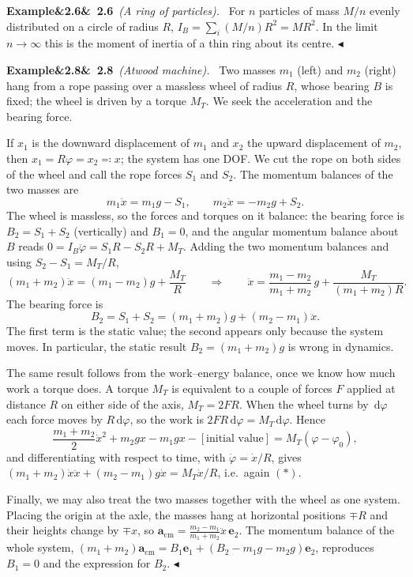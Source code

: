 \documentclass[11pt,a4paper,oneside]{report}
\numberwithin{equation}{chapter}
\newcommand{\vect}[1]{\bm{#1}}
\newcommand{\e}[1]{\vect{e}_{#1}}
\newcommand{\dd}{\,\mathrm{d}}
\newcommand{\cm}{\mathrm{cm}}
\theoremstyle{plain}
\theoremstyle{definition}
\theoremstyle{remark}
\newenvironment{example}[2]{%
  \par\addvspace{\bigskipamount}\noindent
  \textbf{Example\ifx&#1&\else~#1\fi}\ \textit{(#2).}\ \ignorespaces}%
  {\hfill$\blacktriangleleft$\par\addvspace{\bigskipamount}}
\newcommand{\lecture}[2]{\marginpar{\raggedright\footnotesize\textsc{Lecture #1}\\\textit{#2}}}
\begin{document}
\begin{example}{2.6}{A ring of particles}
For $n$ particles of mass $M/n$ evenly distributed on a circle of radius $R$, $I_B=\sum_i(M/n)R^2=MR^2$. In the limit
$n\to\infty$ this is the moment of inertia of a thin ring about its centre.
\end{example}

\lecture{7}{07.10.2026}
\begin{example}{2.8}{Atwood machine}
Two masses $m_1$ (left) and $m_2$ (right) hang from a rope passing over a massless wheel of radius $R$, whose bearing
$B$ is fixed; the wheel is driven by a torque $M_T$. We seek the acceleration and the bearing force.

If $x_1$ is the downward displacement of $m_1$ and $x_2$ the upward displacement of $m_2$, then $x_1=R\varphi=x_2\eqqcolon x$;
the system has one DOF. We cut the rope on both sides of the wheel and call the rope forces $S_1$ and $S_2$. The
momentum balances of the two masses are
\[
  m_1\ddot x=m_1g-S_1,\qquad m_2\ddot x=-m_2g+S_2 .
\]
The wheel is massless, so the forces and torques on it balance: the bearing force is $B_2=S_1+S_2$ (vertically) and
$B_1=0$, and the angular momentum balance about $B$ reads $0=I_B\ddot\varphi=S_1R-S_2R+M_T$. Adding the two
momentum balances and using $S_2-S_1=M_T/R$,
\[
  (m_1+m_2)\ddot x=(m_1-m_2)g+\frac{M_T}{R}\qquad\Longrightarrow\qquad
  \ddot x=\frac{m_1-m_2}{m_1+m_2}\,g+\frac{M_T}{(m_1+m_2)R}. \tag{$\ast$}
\]
The bearing force is
\[
  B_2=S_1+S_2=(m_1+m_2)g+(m_2-m_1)\ddot x .
\]
The first term is the static value; the second appears only because the system moves. In particular, the
static result $B_2=(m_1+m_2)g$ is wrong in dynamics.

The same result follows from the work--energy balance, once we know how much work a torque does. A torque $M_T$ is
equivalent to a couple of forces $F$ applied at distance $R$ on either side of the axis, $M_T=2FR$. When the wheel
turns by $\dd\varphi$ each force moves by $R\dd\varphi$, so the work is $2FR\dd\varphi=M_T\dd\varphi$. Hence
\[
  \frac{m_1+m_2}{2}\dot x^2+m_2gx-m_1gx-[\text{initial value}]=M_T(\varphi-\varphi_0),
\]
and differentiating with respect to time, with $\dot\varphi=\dot x/R$, gives
$(m_1+m_2)\dot x\ddot x+(m_2-m_1)g\dot x=M_T\dot x/R$, i.e.\ again $(\ast)$.

Finally, we may also treat the two masses together with the wheel as one system. Placing the origin at the axle,
the masses hang at horizontal positions $\mp R$ and their heights change by $\mp x$, so
$\vect a_\cm=\frac{m_2-m_1}{m_1+m_2}\ddot x\,\e2$. The momentum balance of the whole system,
$(m_1+m_2)\vect a_\cm=B_1\e1+(B_2-m_1g-m_2g)\e2$, reproduces $B_1=0$ and the expression for $B_2$.
\end{example}
\end{document}
